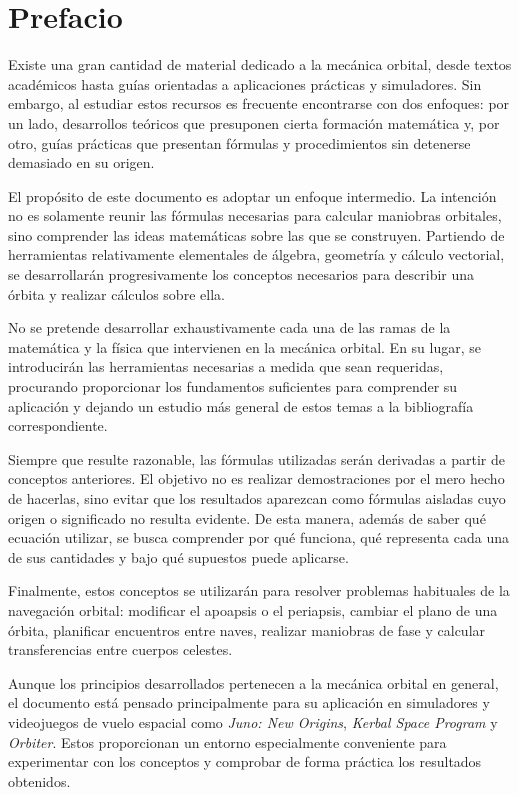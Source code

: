 \chapter*{Prefacio}

Existe una gran cantidad de material dedicado a la mecánica orbital, desde
textos académicos hasta guías orientadas a aplicaciones prácticas y
simuladores. Sin embargo, al estudiar estos recursos es frecuente encontrarse
con dos enfoques: por un lado, desarrollos teóricos que presuponen cierta
formación matemática y, por otro, guías prácticas que presentan fórmulas y
procedimientos sin detenerse demasiado en su origen.

El propósito de este documento es adoptar un enfoque intermedio. La intención
no es solamente reunir las fórmulas necesarias para calcular maniobras
orbitales, sino comprender las ideas matemáticas sobre las que se construyen.
Partiendo de herramientas relativamente elementales de álgebra, geometría y
cálculo vectorial, se desarrollarán progresivamente los conceptos necesarios
para describir una órbita y realizar cálculos sobre ella.

No se pretende desarrollar exhaustivamente cada una de las ramas de la
matemática y la física que intervienen en la mecánica orbital. En su lugar, se
introducirán las herramientas necesarias a medida que sean requeridas,
procurando proporcionar los fundamentos suficientes para comprender su
aplicación y dejando un estudio más general de estos temas a la bibliografía
correspondiente.

Siempre que resulte razonable, las fórmulas utilizadas serán derivadas a
partir de conceptos anteriores. El objetivo no es realizar demostraciones por
el mero hecho de hacerlas, sino evitar que los resultados aparezcan como
fórmulas aisladas cuyo origen o significado no resulta evidente. De esta
manera, además de saber qué ecuación utilizar, se busca comprender por qué
funciona, qué representa cada una de sus cantidades y bajo qué supuestos puede
aplicarse.

Finalmente, estos conceptos se utilizarán para resolver problemas habituales
de la navegación orbital: modificar el apoapsis o el periapsis, cambiar el
plano de una órbita, planificar encuentros entre naves, realizar maniobras de
fase y calcular transferencias entre cuerpos celestes.

Aunque los principios desarrollados pertenecen a la mecánica orbital en
general, el documento está pensado principalmente para su aplicación en
simuladores y videojuegos de vuelo espacial como \textit{Juno: New Origins},
\textit{Kerbal Space Program} y \textit{Orbiter}. Estos proporcionan un entorno
especialmente conveniente para experimentar con los conceptos y comprobar de
forma práctica los resultados obtenidos.
